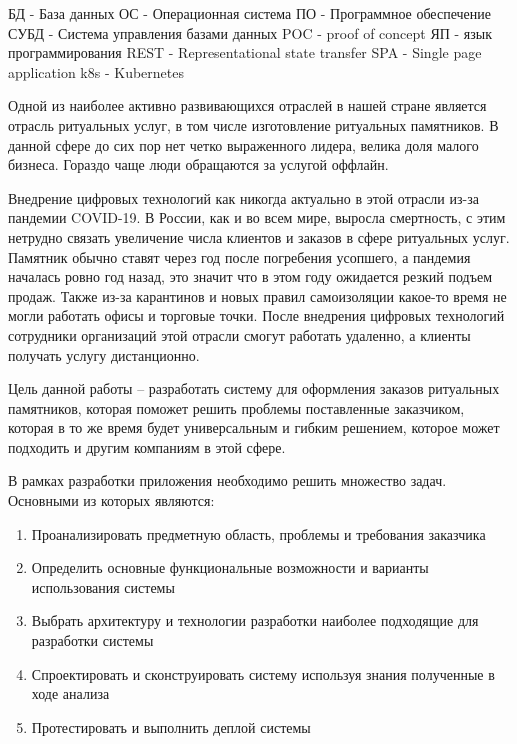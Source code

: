 \documentclass[a4paper,article,14pt]{extarticle}
\begin{document}



БД - База данных
ОС - Операционная система
ПО - Программное обеспечение
СУБД - Система управления базами данных
POC - proof of concept
ЯП - язык программирования
REST - Representational state transfer
SPA - Single page application
k8s - Kubernetes

\pagebreak

\tableofcontents
\pagebreak









Одной из наиболее активно развивающихся отраслей в нашей стране является отрасль ритуальных услуг,
в том числе изготовление ритуальных памятников. 
В данной сфере до сих пор нет четко выраженного лидера, велика доля малого бизнеса.
Гораздо чаще люди обращаются за услугой оффлайн.

Внедрение цифровых технологий как никогда актуально в этой отрасли из-за пандемии COVID-19.
В России, как и во всем мире, выросла смертность, с этим нетрудно связать увеличение числа клиентов и заказов в сфере ритуальных услуг.
Памятник обычно ставят через год после погребения усопшего, а пандемия началась ровно год назад,
это значит что в этом году ожидается резкий подъем продаж. 
Также из-за карантинов и новых правил самоизоляции какое-то время не могли работать офисы и торговые точки. 
После внедрения цифровых технологий сотрудники организаций этой отрасли смогут работать удаленно, а клиенты получать услугу дистанционно.

Цель данной работы – разработать систему для оформления заказов ритуальных памятников,
которая поможет решить проблемы поставленные заказчиком, которая в то же время будет универсальным и гибким решением, которое может
подходить и другим компаниям в этой сфере.
\pagebreak


В рамках разработки приложения необходимо решить множество задач. Основными из которых являются:

\begin{enumerate}
    \item Проанализировать предметную область, проблемы и требования заказчика
    \item Определить основные функциональные возможности и варианты использования системы
    \item Выбрать архитектуру и технологии разработки наиболее подходящие для разработки системы
    \item Спроектировать и сконструировать систему используя знания полученные в ходе анализа
    \item Протестировать и выполнить деплой системы
\end{enumerate}
\end{document}
